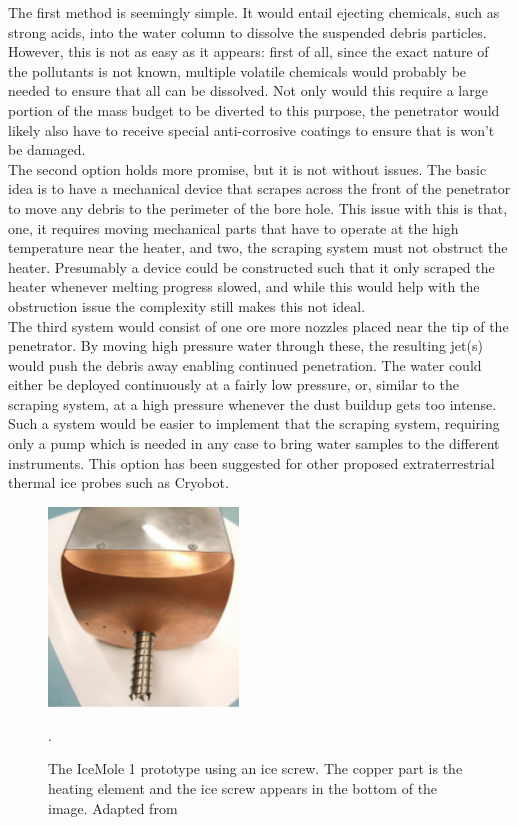 \noindent
The first method is seemingly simple. It would entail ejecting chemicals, such as strong acids, into the water column to dissolve the suspended debris particles. However, this is not as easy as it appears: first of all, since the exact nature of the pollutants is not known, multiple volatile chemicals would probably be needed to ensure that all can be dissolved. Not only would this require a large portion of the mass budget to be diverted to this purpose, the penetrator would likely also have to receive special anti-corrosive coatings to ensure that is won't be damaged.\\

\noindent
The second option holds more promise, but it is not without issues. The basic idea is to have a mechanical device that scrapes across the front of the penetrator to move any debris to the perimeter of the bore hole. This issue with this is that, one, it requires moving mechanical parts that have to operate at the high temperature near the heater, and two, the scraping system must not obstruct the heater. Presumably a device could be constructed such that it only scraped the heater whenever melting progress slowed, and while this would help with the obstruction issue the complexity still makes this not ideal.\\

\noindent
The third system would consist of one ore more nozzles placed near the tip of the penetrator. By moving high pressure water through these, the resulting jet(s) would push the debris away enabling continued penetration. The water could either be deployed continuously at a fairly low pressure, or, similar to the scraping system, at a high pressure whenever the dust buildup gets too intense. Such a system would be easier to implement that the scraping system, requiring only a pump which is needed in any case to bring water samples to the different instruments. This option has been suggested for other proposed extraterrestrial thermal ice probes such as Cryobot\cite{article:zimmerman2001a}.\\

 \begin{figure}[ht]
 	\centering
 	\includegraphics[width=0.45\textwidth]{figures/LAMC/iceScrew}
 	\caption{The IceMole 1 prototype using an ice screw. The copper part is the heating element and the ice screw appears in the bottom of the image. Adapted from \cite{article:dachwald2014a}}.
 	\label{fig:iceScrew}
 \end{figure}   
 
